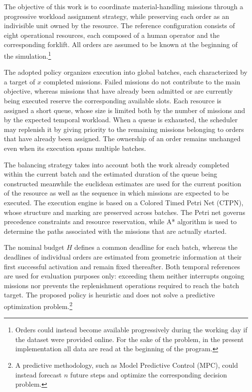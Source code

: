The objective of this work is to coordinate material-handling missions through a progressive workload assignment strategy, while preserving each order as an indivisible unit owned by the resource. The reference configuration consists of eight operational resources, each composed of a human operator and the corresponding forklift. All orders are assumed to be known at the beginning of the simulation.\footnote{Orders could instead become available progressively during the working day if the dataset were provided online. For the sake of the problem, in the present implementation all data are read at the beginning of the program.}

The adopted policy organizes execution into global batches, each characterized by a target of \(x\) completed missions. Failed missions do not contribute to the main objective, whereas missions that have already been admitted or are currently being executed reserve the corresponding available slots. Each resource is assigned a short queue, whose size is limited both by the number of missions and by the expected temporal workload. When a queue is exhausted, the scheduler may replenish it by giving priority to the remaining missions belonging to orders that have already been assigned. The ownership of an order remains unchanged even when its execution spans multiple batches.

The balancing strategy takes into account both the work already completed within the current batch and the estimated duration of the queue being constructed meanwhile the euclidean estimates are used for the current position of the resource as well as the sequence in which missions are expected to be executed. The execution engine is based on a Colored Timed Petri Net (CTPN), whose structure and marking are preserved across batches. The Petri net governs precedence constraints and resource reservation, while A* algorithm is used to determine the paths associated with the missions that are actually started.

The nominal budget \(H\) defines a common deadline for each batch, whereas the deadlines of individual orders are estimated from geometric information at their first successful activation and remain fixed thereafter. Both temporal references are used for evaluation purposes only: exceeding them neither interrupts ongoing missions nor prevents the replenishment operations required to reach the batch target. The proposed policy is heuristic and does not solve a predictive optimization problem.\footnote{A predictive methodology, such as Model Predictive Control (MPC), could instead forecast \(n\) future steps and optimize the corresponding decision problem.}


